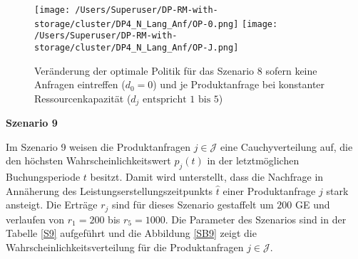 \begin{figure}[h!]     
\begin{center}
\texttt{[image: /Users/Superuser/DP-RM-with-storage/cluster/DP4\_N\_Lang\_Anf/OP-0.png]}
\texttt{[image: /Users/Superuser/DP-RM-with-storage/cluster/DP4\_N\_Lang\_Anf/OP-J.png]}
    \caption{Veränderung der optimale Politik für das Szenario 8 sofern keine Anfragen eintreffen ($d_0=0$) und je Produktanfrage bei konstanter Ressourcenkapazität ($d_j\text{ entspricht }1\text{ bis }5$)}  \label{SV8}
  \end{center}
\end{figure}

\textbf{Szenario 9}

Im Szenario 9 weisen die Produktanfragen $j\in\mathcal{J}$ eine Cauchyverteilung auf, die den höchsten Wahrscheinlichkeitswert $p_j(t)$ in der letztmöglichen Buchungsperiode $t$ besitzt. Damit wird unterstellt, dass die Nachfrage in Annäherung des Leistungserstellungszeitpunkts $\hat t$ einer Produktanfrage $j$ stark ansteigt. Die Erträge $r_j$ sind für dieses Szenario gestaffelt um $200$ GE und verlaufen von $r_1=200$ bis $r_5=1000$. Die Parameter des Szenarios sind in der Tabelle \ref{S9} aufgeführt und die Abbildung \ref{SB9} zeigt die Wahrscheinlichkeitsverteilung für die Produktanfragen $j\in\mathcal{J}$. 

